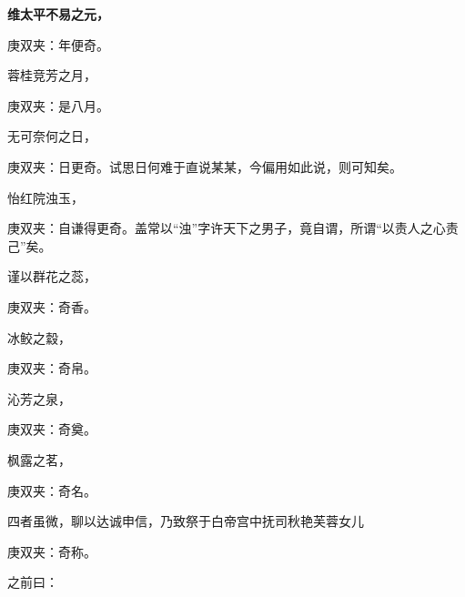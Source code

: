 \begin{qute2sp}
    \bfseries
    维太平不易之元，\begin{note}庚双夹：年便奇。\end{note}蓉桂竞芳之月，\begin{note}庚双夹：是八月。\end{note}无可奈何之日，\begin{note}庚双夹：日更奇。试思日何难于直说某某，今偏用如此说，则可知矣。\end{note}怡红院浊玉，\begin{note}庚双夹：自谦得更奇。盖常以“浊”字许天下之男子，竟自谓，所谓“以责人之心责己”矣。\end{note}谨以群花之蕊，\begin{note}庚双夹：奇香。\end{note}冰鲛之縠，\begin{note}庚双夹：奇帛。\end{note}沁芳之泉，\begin{note}庚双夹：奇奠。\end{note}枫露之茗，\begin{note}庚双夹：奇名。\end{note}四者虽微，聊以达诚申信，乃致祭于白帝宫中抚司秋艳芙蓉女儿\begin{note}庚双夹：奇称。\end{note}之前曰：




\end{qute2sp}
